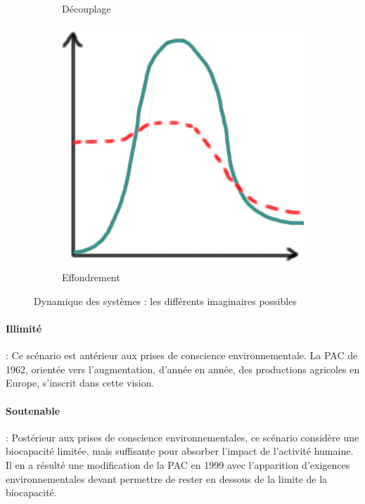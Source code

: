 \documentclass[../thesis.tex]{subfiles}
\begin{document}
\begin{figure}[H]
\begin{subfigure}{.2\textwidth}
            \caption{Découplage}
        \end{subfigure}
        \begin{subfigure}{.2\textwidth}
            \centering
            \includegraphics[width=0.5\linewidth]{img/intro/imaginaire-4}
            \caption{Effondrement}
        \end{subfigure}
        \caption{Dynamique des systèmes : les différents imaginaires possibles}
        \label{fig:02-imaginaire}
    \end{figure}
    \vfill
    
    \paragraph{Illimité} : %
    Ce scénario est antérieur aux prises de conscience environnementale. La PAC de 1962, orientée vers l'augmentation, d'année en année, des productions agricoles en Europe, s'inscrit dans cette vision.
    
    \vspace{-0.5em}
    \paragraph{Soutenable} : %
    Postérieur aux prises de conscience environnementales, ce scénario considère une biocapacité limitée, mais suffisante pour absorber l'impact de l'activité humaine. Il en a résulté une modification de la PAC en 1999 avec l'apparition d'exigences environnementales devant permettre de rester en dessous de la limite de la biocapacité.
    
\end{document}
